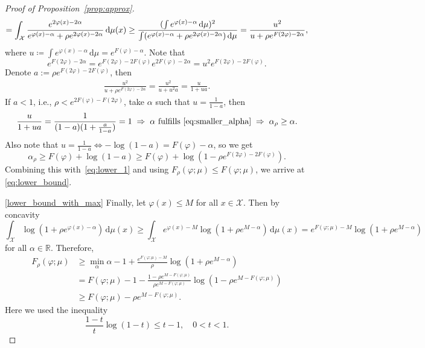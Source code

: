 \documentclass{article}
\newcommand{\dd}{\,\mathrm{d}}
\newcommand{\R}{\mathbb{R}}
\newcommand*{\eqset}{\coloneqq}
\def\cX{\mathcal{X}}
\theoremstyle{plain}
\theoremstyle{definition}
\theoremstyle{remark}
\begin{document}
\begin{proof}[Proof of Proposition~\ref{prop:approx}]
\begin{equation*}
        = \int_{ {\cX}} \frac{e^{2\varphi(x) - 2\alpha}}{e^{\varphi(x) - \alpha} + \rho e^{2\varphi(x) - 2\alpha}} \dd \mu(x) \geq \frac{(\int e^{\varphi(x) - \alpha} \dd \mu)^2}{\int (e^{\varphi(x) - \alpha} + \rho e^{2\varphi(x) - 2\alpha}) \dd \mu} \\
        = \frac{u^2}{u+\rho e^{F(2\varphi) - 2\alpha}},
    \end{equation*}
    where \(u \eqset \int e^{\varphi(x) - \alpha} \dd \mu = e^{F(\varphi) - \alpha}\). Note that
    \[
        e^{F(2\varphi) - 2\alpha} = e^{F(2\varphi) - 2F(\varphi)}e^{2F(\varphi) - 2\alpha} = u^2 e^{F(2\varphi) - 2F(\varphi)}.
    \]
    Denote \(a := \rho e^{F(2\varphi) - 2F(\varphi)}\), then
    \begin{align*}
        \frac{u^2}{u+\rho e^{F(2\varphi) - 2\alpha}} = \frac{u^2}{u + u^2 a} = \frac{u}{1+ua}.
    \end{align*}
    If $a<1$, i.e., $\rho < e^{2F(\varphi) - F(2\varphi)}$, take \(\alpha\) such that \(u = \frac{1}{1-a}\), then
    \[
        \frac{u}{1+ua} = \frac{1}{(1-a)(1+\frac{a}{1-a})} = 1\; \Rightarrow\; \alpha \text{ fulfills } \eqref{eq:smaller_alpha}\; \Rightarrow\; \alpha_\rho \geq \alpha.
    \]
    Also note that \(u = \frac{1}{1-a} \iff - \log(1-a) = F(\varphi)-\alpha\), so we get
    \begin{equation}\label{lower_alph}
        \alpha_\rho \geq F(\varphi) + \log(1-a) \geq F(\varphi) + \log(1-\rho e^{F(2\varphi) - 2F(\varphi)}).
    \end{equation}
    Combining this with~\eqref{eq:lower_1} 
    and using \(F_\rho(\varphi; \mu) \leq F(\varphi; \mu)\), 
    we arrive at \eqref{eq:lower_bound}.

    \ref{lower_bound_with_max} Finally, let $\varphi(x) \le M$ for all $x \in \cX$. Then by concavity 
    \[
    \int_{ {\cX}} \log\left(1 + \rho e^{\varphi(x) - \alpha}\right) \dd \mu(x) 
    \ge \int_{ {\cX}} e^{\varphi(x) - M} \log\left(1 + \rho e^{M - \alpha}\right) \dd \mu(x)
    = e^{F(\varphi; \mu) - M} \log\left(1 + \rho e^{M - \alpha}\right)
    \]
    for all $\alpha \in \R$. Therefore,
    \begin{align*}
        F_\rho(\varphi ; \mu) &\ge \min_\alpha \alpha - 1 + \frac{e^{F(\varphi; \mu) - M}}{\rho} \log\left(1 + \rho e^{M - \alpha}\right) \\
        &= F(\varphi; \mu) - 1 - \frac{1 - \rho e^{M - F(\varphi; \mu)}}{\rho e^{M - F(\varphi; \mu)}} \log\left(1 - \rho e^{M - F(\varphi; \mu)}\right) \\
        &\ge F(\varphi; \mu) - \rho e^{M - F(\varphi; \mu)} .
    \end{align*}
    Here we used the inequality 
    \[
    \frac{1 - t}{t} \log(1 - t) \le t - 1, \quad 0 < t < 1 .
    \]
\end{proof}
\end{document}
